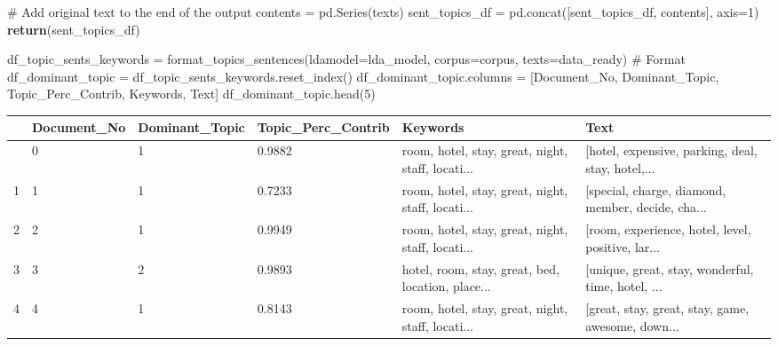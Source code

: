 \documentclass[
  letterpaper,
  DIV=11,
  numbers=noendperiod]{scrreprt}
\newenvironment{Shaded}{\begin{snugshade}}{\end{snugshade}}
\newcommand{\CommentTok}[1]{\textcolor[rgb]{0.37,0.37,0.37}{#1}}
\newcommand{\ControlFlowTok}[1]{\textcolor[rgb]{0.00,0.23,0.31}{\textbf{#1}}}
\newcommand{\DecValTok}[1]{\textcolor[rgb]{0.68,0.00,0.00}{#1}}
\newcommand{\NormalTok}[1]{\textcolor[rgb]{0.00,0.23,0.31}{#1}}
\newcommand{\OperatorTok}[1]{\textcolor[rgb]{0.37,0.37,0.37}{#1}}
\newcommand{\StringTok}[1]{\textcolor[rgb]{0.13,0.47,0.30}{#1}}
\newcounter{none} %
\begin{document}
\begin{Shaded}
\begin{Highlighting}[]
    \CommentTok{\# Add original text to the end of the output}
\NormalTok{    contents }\OperatorTok{=}\NormalTok{ pd.Series(texts)}
\NormalTok{    sent\_topics\_df }\OperatorTok{=}\NormalTok{ pd.concat([sent\_topics\_df, contents], axis}\OperatorTok{=}\DecValTok{1}\NormalTok{)}
    \ControlFlowTok{return}\NormalTok{(sent\_topics\_df)}
\end{Highlighting}
\end{Shaded}

\begin{Shaded}
\begin{Highlighting}[]
\NormalTok{df\_topic\_sents\_keywords }\OperatorTok{=}\NormalTok{ format\_topics\_sentences(ldamodel}\OperatorTok{=}\NormalTok{lda\_model, corpus}\OperatorTok{=}\NormalTok{corpus, texts}\OperatorTok{=}\NormalTok{data\_ready)}
\CommentTok{\# Format}
\NormalTok{df\_dominant\_topic }\OperatorTok{=}\NormalTok{ df\_topic\_sents\_keywords.reset\_index()}
\NormalTok{df\_dominant\_topic.columns }\OperatorTok{=}\NormalTok{ [}\StringTok{\textquotesingle{}Document\_No\textquotesingle{}}\NormalTok{, }\StringTok{\textquotesingle{}Dominant\_Topic\textquotesingle{}}\NormalTok{, }\StringTok{\textquotesingle{}Topic\_Perc\_Contrib\textquotesingle{}}\NormalTok{, }\StringTok{\textquotesingle{}Keywords\textquotesingle{}}\NormalTok{, }\StringTok{\textquotesingle{}Text\textquotesingle{}}\NormalTok{]}
\NormalTok{df\_dominant\_topic.head(}\DecValTok{5}\NormalTok{)}
\end{Highlighting}
\end{Shaded}

{\def\LTcaptype{none} %
\begin{longtable}[]{@{}llllll@{}}
\toprule\noalign{}
& Document\_No & Dominant\_Topic & Topic\_Perc\_Contrib & Keywords &
Text \\
\midrule\noalign{}
\endhead
\bottomrule\noalign{}
\endlastfoot
0 & 0 & 1 & 0.9882 & room, hotel, stay, great, night, staff, locati... &
{[}hotel, expensive, parking, deal, stay, hotel,... \\
1 & 1 & 1 & 0.7233 & room, hotel, stay, great, night, staff, locati... &
{[}special, charge, diamond, member, decide, cha... \\
2 & 2 & 1 & 0.9949 & room, hotel, stay, great, night, staff, locati... &
{[}room, experience, hotel, level, positive, lar... \\
3 & 3 & 2 & 0.9893 & hotel, room, stay, great, bed, location, place... &
{[}unique, great, stay, wonderful, time, hotel, ... \\
4 & 4 & 1 & 0.8143 & room, hotel, stay, great, night, staff, locati... &
{[}great, stay, great, stay, game, awesome, down... \\
\end{longtable}
}
\end{document}
